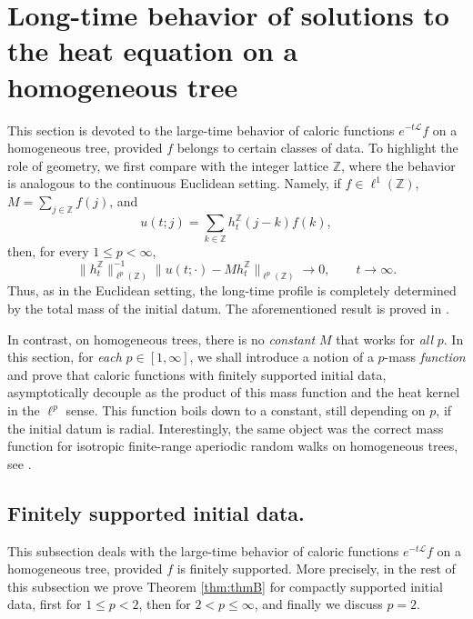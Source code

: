 \documentclass[11pt,a4paper,reqno]{amsart}
\renewcommand\mathcal{\mathscr}
\theoremstyle{plain}
\theoremstyle{remark}
\theoremstyle{definition}
\theoremstyle{remark}
\numberwithin{equation}{section}
\begin{document}
	

	\section{Long-time behavior of solutions to the heat equation on a homogeneous tree} \label{sec:T}

This section is devoted to the large-time behavior of caloric functions $e^{-t\mathcal{L}}f$ on a homogeneous tree, provided $f$ belongs to certain classes of data. To highlight the role of geometry, we first compare with the integer lattice $\mathbb{Z}$, where the behavior is analogous to the continuous Euclidean setting. Namely, if $f\in \ell^1(\mathbb{Z})$, $M=\sum_{j\in\mathbb{Z}}f(j)$, and
\[
u(t;j)=\sum_{k\in\mathbb{Z}}h_t^{\mathbb{Z}}(j-k)f(k),
\]
then, for every $1\le p<\infty$,
\[
\|h_t^{\mathbb{Z}}\|_{\ell^p(\mathbb{Z})}^{-1}
\|u(t;\cdot)-Mh_t^{\mathbb{Z}}\|_{\ell^p(\mathbb{Z})}
\to 0,
\qquad t\to\infty.
\]
Thus, as in the Euclidean setting, the long-time profile is completely determined by the total mass of the initial datum. The aforementioned result is proved in \cite[Theorem~6.1]{Abadiasetal}.
	
	In contrast, on homogeneous trees, there is no \textit{constant} $M$ that works for \textit{all} $p$. In this section, for \textit{each} $p \in [1, \infty]$, we shall introduce a notion 
	of a $p$-mass \textit{function} and prove that caloric functions with finitely supported initial data,  asymptotically decouple as the product of this mass function and the heat kernel in the $\ell^p$ sense. This function boils down to a constant, still depending on $p$, if the initial datum is radial.  Interestingly, the same object was the correct mass function for isotropic finite-range aperiodic random walks on homogeneous trees, see \cite[Subsection 4.2]{PT}.

    \subsection{Finitely supported initial data.}\label{sec:finitelysupp}
	
	This subsection deals with the large-time behavior of caloric functions $e^{-t\mathcal{L}}f$ on a homogeneous tree, provided $f$ is finitely supported. More precisely, in the rest of this subsection we prove Theorem \ref{thm:thmB} for compactly supported initial data, first for $1\leq p<2$, then for $2<p\leq \infty$, and finally we discuss $p=2$.
	
\end{document}
